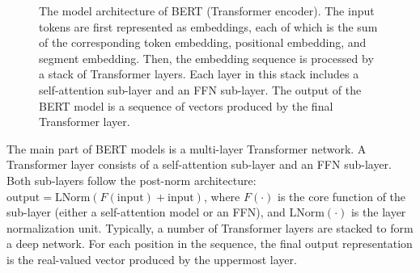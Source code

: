 \vspace{0.5em}
\begin{center}
\begingroup
\renewcommand{\arraystretch}{1.2}
\setlength{\tabcolsep}{2pt}
{\small
{}
}
\endgroup
\end{center}
\vspace{0.5em}

\begin{figure}[!t]
\centering

\caption{The model architecture of BERT (Transformer encoder). The input tokens are first represented as embeddings, each of which is the sum of the corresponding token embedding, positional embedding, and segment embedding. Then, the embedding sequence is processed by a stack of Transformer layers. Each layer in this stack includes a self-attention sub-layer and an FFN sub-layer. The output of the BERT model is a sequence of vectors produced by the final Transformer layer.}
\label{fig:bert-architecture}
\end{figure}

The main part of BERT models is a multi-layer Transformer network. A Transformer layer consists of a self-attention sub-layer and an FFN sub-layer. Both sub-layers follow the post-norm architecture: $\mathrm{output} = \mathrm{LNorm}(F(\mathrm{input}) + \mathrm{input})$, where $F(\cdot)$ is the core function of the sub-layer (either a self-attention model or an FFN), and $\mathrm{LNorm}(\cdot)$ is the layer normalization unit. Typically, a number of Transformer layers are stacked to form a deep network. For each position in the sequence, the final output representation is the real-valued vector produced by the uppermost layer.

